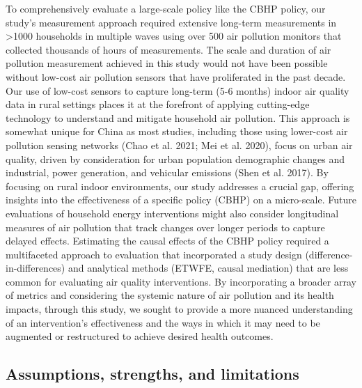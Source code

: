 \documentclass[
  letterpaper,
  DIV=11,
  numbers=noendperiod]{scrartcl}
\begin{document}
To comprehensively evaluate a large-scale policy like the CBHP policy,
our study's measurement approach required extensive long-term
measurements in \textgreater1000 households in multiple waves using over
500 air pollution monitors that collected thousands of hours of
measurements. The scale and duration of air pollution measurement
achieved in this study would not have been possible without low-cost air
pollution sensors that have proliferated in the past decade. Our use of
low-cost sensors to capture long-term (5-6 months) indoor air quality
data in rural settings places it at the forefront of applying
cutting-edge technology to understand and mitigate household air
pollution. This approach is somewhat unique for China as most studies,
including those using lower-cost air pollution sensing networks (Chao et
al. 2021; Mei et al. 2020), focus on urban air quality, driven by
consideration for urban population demographic changes and industrial,
power generation, and vehicular emissions (Shen et al. 2017). By
focusing on rural indoor environments, our study addresses a crucial
gap, offering insights into the effectiveness of a specific policy
(CBHP) on a micro-scale. Future evaluations of household energy
interventions might also consider longitudinal measures of air pollution
that track changes over longer periods to capture delayed effects.
Estimating the causal effects of the CBHP policy required a multifaceted
approach to evaluation that incorporated a study design
(difference-in-differences) and analytical methods (ETWFE, causal
mediation) that are less common for evaluating air quality
interventions. By incorporating a broader array of metrics and
considering the systemic nature of air pollution and its health impacts,
through this study, we sought to provide a more nuanced understanding of
an intervention's effectiveness and the ways in which it may need to be
augmented or restructured to achieve desired health outcomes.

\hypertarget{assumptions-strengths-and-limitations}{%
\subsection{Assumptions, strengths, and
limitations}\label{assumptions-strengths-and-limitations}}
\end{document}

